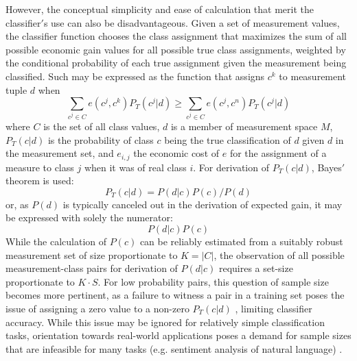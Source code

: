 \documentclass[10pt, conference]{IEEEtran}
\begin{document}
However, the conceptual simplicity and ease of calculation that merit the classifier$'$s use can also be disadvantageous. Given a set of measurement values, the classifier function chooses the class assignment that maximizes the sum of all possible economic gain  values for all possible true class assignments, weighted by the conditional probability of each true assignment given the measurement being classified. Such may be expressed as the function that assigns $c^k$ to measurement tuple $d$ when
\begin{equation}\label{eq:expectedGain}
\sum_{c^j \in C}{e(c^j, c^k)P_T(c^j|d)} \geq \sum_{c^j \in C}{e(c^j,c^n)P_T(c^j|d)} 
\end{equation}
where $C$ is the set of all class values,  $d$ is a member of measurement space $M$, $P_T(c|d)$ is the probability of class $c$ being the true classification of $d$ given $d$ in the measurement set, and $e_{i,j}$  the economic cost of $e$ for the assignment of a measure to class $j$ when it was of real class $i$.  For derivation of $P_T(c|d)$, Bayes$'$ theorem is used:
\begin{equation}
P_T(c|d)=P(d|c)P(c)/P(d)
\end{equation}
or, as $P(d)$ is typically canceled out in the derivation of expected gain, it may be expressed with solely the numerator:
\begin{equation}\label{eq:BayesNumerator}
P(d|c)P(c)
\end{equation}
While the calculation of $P(c)$ can be reliably estimated from a suitably robust measurement set of size proportionate to $K = |C|$, the observation of all possible measurement-class pairs for derivation of $P(d|c)$ requires a set-size proportionate to $K\cdot S$. For low probability pairs, this question of sample size becomes more pertinent, as a failure to witness a pair in a training set poses the issue of assigning a zero value to a non-zero $P_T(c|d)$ \cite{b1}, limiting classifier accuracy. While this issue may be ignored for relatively simple classification tasks, orientation towards real-world applications poses a demand for sample sizes that are infeasible for many tasks (e.g. sentiment analysis of natural language) \cite{b2}. 
\end{document}
